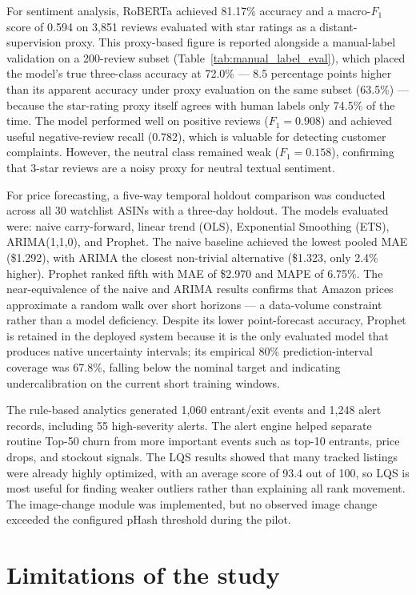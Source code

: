 For sentiment analysis, RoBERTa achieved 81.17\% accuracy and a macro-$F_1$ score of 0.594 on 3,851 reviews evaluated with star ratings as a distant-supervision proxy. This proxy-based figure is reported alongside a manual-label validation on a 200-review subset (Table~\ref{tab:manual_label_eval}), which placed the model's true three-class accuracy at 72.0\% --- 8.5 percentage points higher than its apparent accuracy under proxy evaluation on the same subset (63.5\%) --- because the star-rating proxy itself agrees with human labels only 74.5\% of the time. The model performed well on positive reviews ($F_1 = 0.908$) and achieved useful negative-review recall (0.782), which is valuable for detecting customer complaints. However, the neutral class remained weak ($F_1 = 0.158$), confirming that 3-star reviews are a noisy proxy for neutral textual sentiment.

For price forecasting, a five-way temporal holdout comparison was conducted across all 30 watchlist ASINs with a three-day holdout. The models evaluated were: naive carry-forward, linear trend (OLS), Exponential Smoothing (ETS), ARIMA(1,1,0), and Prophet. The naive baseline achieved the lowest pooled MAE (\$1.292), with ARIMA the closest non-trivial alternative (\$1.323, only 2.4\% higher). Prophet ranked fifth with MAE of \$2.970 and MAPE of 6.75\%. The near-equivalence of the naive and ARIMA results confirms that Amazon prices approximate a random walk over short horizons — a data-volume constraint rather than a model deficiency. Despite its lower point-forecast accuracy, Prophet is retained in the deployed system because it is the only evaluated model that produces native uncertainty intervals; its empirical 80\% prediction-interval coverage was 67.8\%, falling below the nominal target and indicating undercalibration on the current short training windows.

The rule-based analytics generated 1,060 entrant/exit events and 1,248 alert records, including 55 high-severity alerts. The alert engine helped separate routine Top-50 churn from more important events such as top-10 entrants, price drops, and stockout signals. The LQS results showed that many tracked listings were already highly optimized, with an average score of 93.4 out of 100, so LQS is most useful for finding weaker outliers rather than explaining all rank movement. The image-change module was implemented, but no observed image change exceeded the configured pHash threshold during the pilot.

\section{Limitations of the study}

